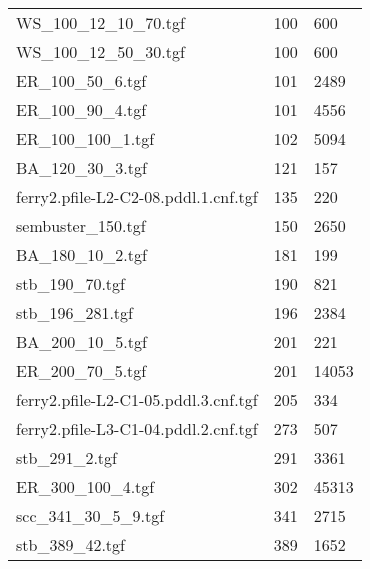 \begin{longtable}{| p{} | p{} | p{} | }
	WS\_100\_12\_10\_70.tgf                                                        & 100  & 600     \\
	WS\_100\_12\_50\_30.tgf                                                        & 100  & 600     \\
	ER\_100\_50\_6.tgf                                                             & 101  & 2489    \\
	ER\_100\_90\_4.tgf                                                             & 101  & 4556    \\
	ER\_100\_100\_1.tgf                                                            & 102  & 5094    \\
	BA\_120\_30\_3.tgf                                                             & 121  & 157     \\
	ferry2.pfile-L2-C2-08.pddl.1.cnf.tgf                                           & 135  & 220     \\
	sembuster\_150.tgf                                                             & 150  & 2650    \\
	BA\_180\_10\_2.tgf                                                             & 181  & 199     \\
	stb\_190\_70.tgf                                                               & 190  & 821     \\
	stb\_196\_281.tgf                                                              & 196  & 2384    \\
	BA\_200\_10\_5.tgf                                                             & 201  & 221     \\
	ER\_200\_70\_5.tgf                                                             & 201  & 14053   \\
	ferry2.pfile-L2-C1-05.pddl.3.cnf.tgf                                           & 205  & 334     \\
	ferry2.pfile-L3-C1-04.pddl.2.cnf.tgf                                           & 273  & 507     \\
	stb\_291\_2.tgf                                                                & 291  & 3361    \\
	ER\_300\_100\_4.tgf                                                            & 302  & 45313   \\
	scc\_341\_30\_5\_9.tgf                                                         & 341  & 2715    \\
	stb\_389\_42.tgf                                                               & 389  & 1652    \\

\end{longtable}
